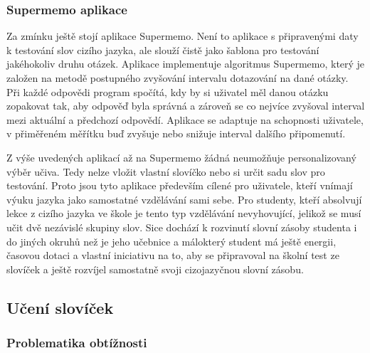 \documentclass[a4paper,11pt,titlepage,fleqn]{article}
\begin{document}
        \subsubsection{Supermemo aplikace}
            Za zmínku ještě stojí aplikace Supermemo. Není to aplikace s připravenými daty k testování slov cizího jazyka, ale slouží čistě jako šablona pro testování jakéhokoliv druhu otázek. Aplikace implementuje algoritmus Supermemo, který je založen na metodě postupného zvyšování intervalu dotazování na dané otázky. Při každé odpovědi program spočítá, kdy by si uživatel měl danou otázku zopakovat tak, aby odpověď byla správná a zároveň se co nejvíce zvyšoval interval mezi aktuální a předchozí odpovědí. Aplikace se adaptuje na schopnosti uživatele, v přiměřeném měřítku buď zvyšuje nebo snižuje interval dalšího připomenutí.



        Z výše uvedených aplikací až na Supermemo žádná neumožňuje personalizovaný výběr učiva. Tedy nelze vložit vlastní slovíčko nebo si určit sadu slov pro testování. Proto jsou tyto aplikace především cílené pro uživatele, kteří vnímají výuku jazyka jako samostatné vzdělávání sami sebe. Pro studenty, kteří absolvují lekce z cizího jazyka ve škole je tento typ vzdělávání nevyhovující, jelikož se musí učit dvě nezávislé skupiny slov. Sice dochází k rozvinutí slovní zásoby studenta i do jiných okruhů než je jeho učebnice a málokterý student má ještě energii, časovou dotaci a vlastní iniciativu na to, aby se připravoval na školní test ze slovíček a ještě rozvíjel samostatně svoji cizojazyčnou slovní zásobu.

    \subsection{Učení slovíček}

        \subsubsection{Problematika obtížnosti}
\end{document}
